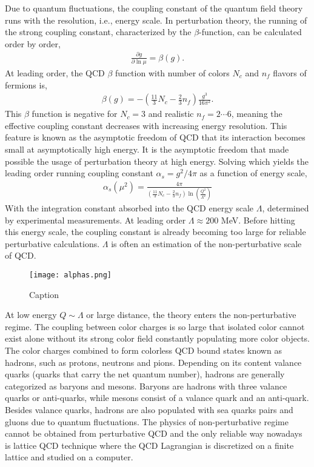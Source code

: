Due to quantum fluctuations, the coupling constant of the quantum field theory runs with the resolution, i.e., energy scale. 
In perturbation theory, the running of the strong coupling constant, characterized by the $\beta$-function, can be calculated order by order, 
\begin{eqnarray}
\frac{\partial g}{\partial \ln\mu} = \beta(g).
\end{eqnarray}
At leading order, the QCD $\beta$ function with number of colors $N_c$ and $n_f$ flavors of fermions is,
\begin{eqnarray}
\beta(g) = - \left( \frac{11}{3}N_c - \frac{2}{3}n_f \right) \frac{g^3}{16\pi^2}.
\end{eqnarray}
This $\beta$ function is negative for $N_c=3$ and realistic $n_f = 2\cdots 6$, meaning the effective coupling constant decreases with increasing energy resolution.
This feature is known as the asymptotic freedom of QCD that its interaction becomes small at asymptotically high energy.
It is the asymptotic freedom that made possible the usage of perturbation theory at high energy.
Solving which yields the leading order running coupling constant $\alpha_s = g^2/4\pi$ as a function of energy scale,
\begin{eqnarray}
    \alpha_s(\mu^2) = \frac{4\pi}{\left(\frac{11}{3}N_c - \frac{2}{3}n_f\right)\ln\left(\frac{Q^2}{\Lambda^2}\right)}
\end{eqnarray}
With the integration constant absorbed into the QCD energy scale $\Lambda$, determined by experimental measurements. 
At leading order $\Lambda \approx 200$ MeV.
Before hitting this energy scale, the coupling constant is already becoming too large for reliable perturbative calculations.
$\Lambda$ is often an estimation of the non-perturbative scale of QCD.

\begin{figure}
    \centering
    \texttt{[image: alphas.png]}
    \caption{Caption}
    \label{fig:alphas}
\end{figure}

At low energy $Q\sim \Lambda$ or large distance, the theory enters the non-perturbative regime. 
The coupling between color charges is so large that isolated color cannot exist alone without its strong color field constantly populating more color objects.
The color charges combined to form colorless QCD bound states known as hadrons, such as protons, neutrons and pions.
Depending on its content valance quarks (quarks that carry the net quantum number), hadrons are generally categorized as baryons and mesons.
Baryons are hadrons with three valance quarks or anti-quarks, while mesons consist of a valance quark and an anti-quark.
Besides valance quarks, hadrons are also populated with sea quarks pairs and gluons due to quantum fluctuations.
The physics of non-perturbative regime cannot be obtained from perturbative QCD and the only reliable way nowadays is lattice QCD technique where the QCD Lagrangian is discretized on a finite lattice and studied on a computer.

